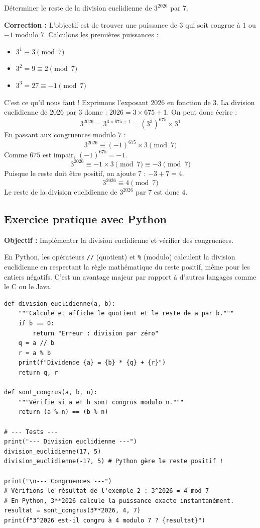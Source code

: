 \begin{exemple}
Déterminer le reste de la division euclidienne de $3^{2026}$ par $7$.
\end{exemple}

\textbf{Correction :} L'objectif est de trouver une puissance de $3$ qui soit congrue à $1$ ou $-1$ modulo $7$.
Calculons les premières puissances :
\begin{itemize}
    \item $3^1 \equiv 3 \pmod{7}$
    \item $3^2 = 9 \equiv 2 \pmod{7}$
    \item $3^3 = 27 \equiv -1 \pmod{7}$
\end{itemize}
C'est ce qu'il nous faut ! Exprimons l'exposant $2026$ en fonction de $3$. La division euclidienne de $2026$ par $3$ donne : $2026 = 3 \times 675 + 1$.
On peut donc écrire :
$$3^{2026} = 3^{3 \times 675 + 1} = (3^3)^{675} \times 3^1$$
En passant aux congruences modulo $7$ :
$$3^{2026} \equiv (-1)^{675} \times 3 \pmod{7}$$
Comme $675$ est impair, $(-1)^{675} = -1$.
$$3^{2026} \equiv -1 \times 3 \pmod{7} \equiv -3 \pmod{7}$$
Puisque le reste doit être positif, on ajoute $7$ : $-3 + 7 = 4$.
$$3^{2026} \equiv 4 \pmod{7}$$
Le reste de la division euclidienne de $3^{2026}$ par $7$ est donc $4$.

\subsection{Exercice pratique avec Python}

\textbf{Objectif :} Implémenter la division euclidienne et vérifier des congruences.

En Python, les opérateurs \texttt{//} (quotient) et \texttt{\%} (modulo) calculent la division euclidienne en respectant la règle mathématique du reste positif, même pour les entiers négatifs. C'est un avantage majeur par rapport à d'autres langages comme le C ou le Java.

\begin{verbatim}
def division_euclidienne(a, b):
    """Calcule et affiche le quotient et le reste de a par b."""
    if b == 0:
        return "Erreur : division par zéro"
    q = a // b
    r = a % b
    print(f"Dividende {a} = {b} * {q} + {r}")
    return q, r

def sont_congrus(a, b, n):
    """Vérifie si a et b sont congrus modulo n."""
    return (a % n) == (b % n)

# --- Tests ---
print("--- Division euclidienne ---")
division_euclidienne(17, 5)
division_euclidienne(-17, 5) # Python gère le reste positif !

print("\n--- Congruences ---")
# Vérifions le résultat de l'exemple 2 : 3^2026 = 4 mod 7
# En Python, 3**2026 calcule la puissance exacte instantanément.
resultat = sont_congrus(3**2026, 4, 7)
print(f"3^2026 est-il congru à 4 modulo 7 ? {resultat}")
\end{verbatim}

